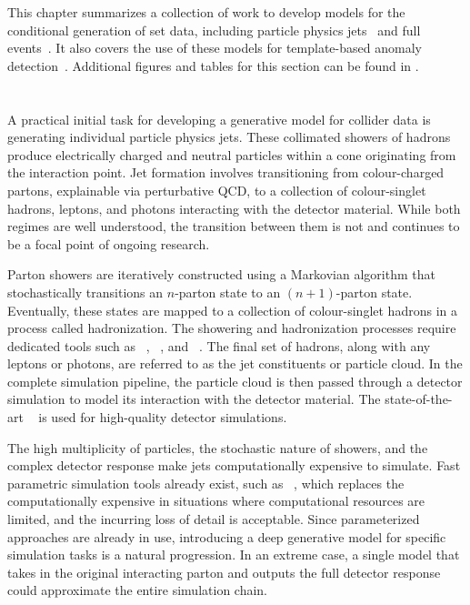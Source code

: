 This chapter summarizes a collection of work to develop models for the conditional generation of set data, including particle physics jets~\cite{PCJedi, EpicJedi, PCDroid} and full events~\cite{PIPPIN}.
It also covers the use of these models for template-based anomaly detection~\cite{Drapes, RadOT}.
Additional figures and tables for this section can be found in .

\section{\pcjedi}

A practical initial task for developing a generative model for collider data is generating individual particle physics jets.
These collimated showers of hadrons produce electrically charged and neutral particles within a cone originating from the interaction point.
Jet formation involves transitioning from colour-charged partons, explainable via perturbative QCD, to a collection of colour-singlet hadrons, leptons, and photons interacting with the detector material.
While both regimes are well understood, the transition between them is not and continues to be a focal point of ongoing research.

Parton showers are iteratively constructed using a Markovian algorithm that stochastically transitions an $n$-parton state to an $(n+1)$-parton state.
Eventually, these states are mapped to a collection of colour-singlet hadrons in a process called hadronization.
The showering and hadronization processes require dedicated tools such as \pythia~\cite{Pythia8}, \sherpa~\cite{Sherpa}, and \herwig~\cite{Herwig}.
The final set of hadrons, along with any leptons or photons, are referred to as the jet constituents or particle cloud.
In the complete simulation pipeline, the particle cloud is then passed through a detector simulation to model its interaction with the detector material.
The state-of-the-art \geant~\cite{Geant4} is used for high-quality detector simulations.

The high multiplicity of particles, the stochastic nature of showers, and the complex detector response make jets computationally expensive to simulate.
Fast parametric simulation tools already exist, such as \delphes~\cite{Delphes}, which replaces the computationally expensive \geant in situations where computational resources are limited, and the incurring loss of detail is acceptable.
Since parameterized approaches are already in use, introducing a deep generative model for specific simulation tasks is a natural progression.
In an extreme case, a single model that takes in the original interacting parton and outputs the full detector response could approximate the entire simulation chain.

